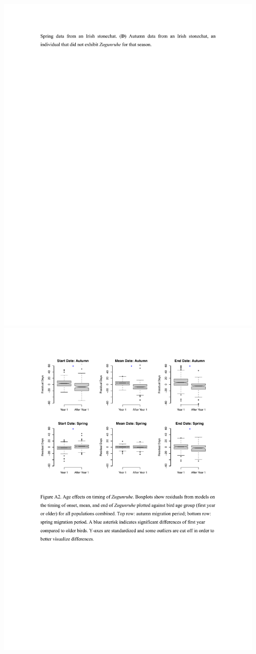 \documentclass[a4paper, twoside]{templates/ociamthesis}
\begin{document}
\includegraphics[width=1\linewidth]{pdf_chapters/zug/zug_supp_crop_Part12}
\includegraphics[width=1\linewidth]{pdf_chapters/zug/zug_supp_crop_Part13}
\end{document}
